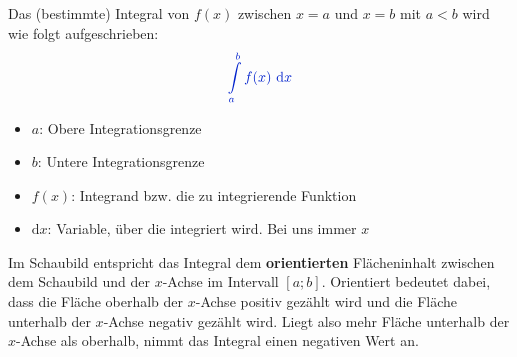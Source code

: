 Das (bestimmte) Integral von \(f(x)\) zwischen \(x=a\) und \(x=b\) mit \(a<b\) wird wie folgt aufgeschrieben:
\[\textcolor{loes}{\int\limits_a^b f(x)\td x}\]
\begin{itemize}
	\item \(a\): \textcolor{loes}{Obere Integrationsgrenze}

    \bigskip

	\item \(b\): \textcolor{loes}{Untere Integrationsgrenze}

    \bigskip

	\item \(f(x)\): \textcolor{loes}{Integrand bzw. die zu integrierende Funktion}

    \bigskip

	\item \(\text{d} x\): \textcolor{loes}{Variable, über die integriert wird. Bei uns immer \(x\)}

    \bigskip

\end{itemize}
\begin{tcolorbox}
	\textcolor{loestc}{Im Schaubild entspricht das Integral dem \textbf{orientierten} Flächeninhalt zwischen dem Schaubild und der \(x\)-Achse im Intervall \([a;b]\). Orientiert bedeutet dabei, dass die Fläche oberhalb der \(x\)-Achse positiv gezählt wird und die Fläche unterhalb der \(x\)-Achse negativ gezählt wird. Liegt also mehr Fläche unterhalb der \(x\)-Achse als oberhalb, nimmt das Integral einen negativen Wert an.}
\end{tcolorbox}
